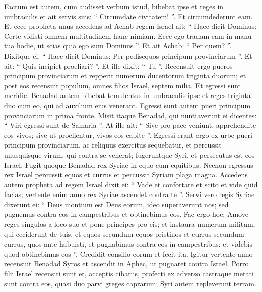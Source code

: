 \begin{biblechapter}
\begin{biblechapter}
\begin{biblechapter}
\begin{biblechapter}
\begin{biblechapter}
\begin{biblechapter}
\begin{biblechapter}
\begin{biblechapter}
\begin{biblechapter}
\begin{biblechapter}
\begin{biblechapter}
\begin{biblechapter}
\begin{biblechapter}
\begin{biblechapter}
\begin{biblechapter}
\begin{biblechapter}
\begin{biblechapter}
\begin{biblechapter}
\begin{biblechapter}
\begin{biblechapter}
\verse Factum est autem, cum audisset verbum istud, bibebat ipse et reges in umbraculis et ait servis suis: “ Circumdate civitatem! ”. Et circumdederunt eam.
 \verse Et ecce propheta unus accedens ad Achab regem Israel ait: “ Haec dicit Dominus: Certe vidisti omnem multitudinem hanc nimiam. Ecce ego tradam eam in manu tua hodie, ut scias quia ego sum Dominus ”. 
\verse Et ait Achab: “ Per quem? ”. Dixitque ei: “ Haec dicit Dominus: Per pedisequos principum provinciarum ”. Et ait: “ Quis incipiet proeliari? ”. Et ille dixit: “ Tu ”.
 \verse Recensuit ergo pueros principum provinciarum et repperit numerum ducentorum triginta duorum; et post eos recensuit populum, omnes filios Israel, septem milia. 
\verse Et egressi sunt meridie. Benadad autem bibebat temulentus in umbraculis ipse et reges triginta duo cum eo, qui ad auxilium eius venerant. 
 \verse Egressi sunt autem pueri principum provinciarum in prima fronte. Misit itaque Benadad, qui nuntiaverunt ei dicentes: “ Viri egressi sunt de Samaria ”. 
\verse At ille ait: “ Sive pro pace veniunt, apprehendite eos vivos; sive ut proelientur, vivos eos capite ”. 
\verse Egressi erant ergo ex urbe pueri principum provinciarum, ac reliquus exercitus sequebatur, 
\verse et percussit unusquisque virum, qui contra se venerat; fugeruntque Syri, et persecutus est eos Israel. Fugit quoque Benadad rex Syriae in equo cum equitibus. 
\verse Necnon egressus rex Israel percussit equos et currus et percussit Syriam plaga magna.
 \verse Accedens autem propheta ad regem Israel dixit ei: “ Vade et confortare et scito et vide quid facias; vertente enim anno rex Syriae ascendet contra te ”.
 \verse Servi vero regis Syriae dixerunt ei: “ Deus montium est Deus eorum, ideo superaverunt nos; sed pugnemus contra eos in campestribus et obtinebimus eos. 
 \verse Fac ergo hoc: Amove reges singulos a loco suo et pone principes pro eis; 
 \verse et instaura numerum militum, qui ceciderunt de tuis, et equos secundum equos pristinos et currus secundum currus, quos ante habuisti, et pugnabimus contra eos in campestribus: et videbis quod obtinebimus eos ”. Credidit consilio eorum et fecit ita.
 \verse Igitur vertente anno recensuit Benadad Syros et ascendit in Aphec, ut pugnaret contra Israel. 
\verse Porro filii Israel recensiti sunt et, acceptis cibariis, profecti ex adverso castraque metati sunt contra eos, quasi duo parvi greges caprarum; Syri autem repleverunt terram.

\end{biblechapter}
\end{biblechapter}
\end{biblechapter}
\end{biblechapter}
\end{biblechapter}
\end{biblechapter}
\end{biblechapter}
\end{biblechapter}
\end{biblechapter}
\end{biblechapter}
\end{biblechapter}
\end{biblechapter}
\end{biblechapter}
\end{biblechapter}
\end{biblechapter}
\end{biblechapter}
\end{biblechapter}
\end{biblechapter}
\end{biblechapter}
\end{biblechapter}
